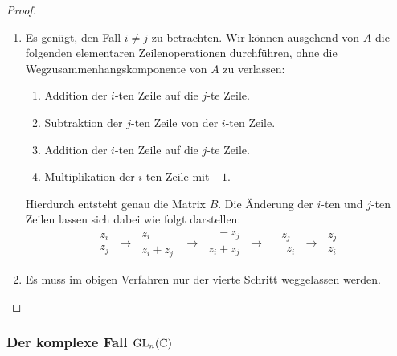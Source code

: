 \begin{proof}
\begin{enumerate}[label = \alph*)]
    \item
      Es genügt, den Fall $i \neq j$ zu betrachten.
      Wir können ausgehend von $A$ die folgenden elementaren Zeilenoperationen durchführen, ohne die Wegzusammenhangskomponente von $A$ zu verlassen:
      \begin{enumerate}[label = \arabic*.]
        \item
          Addition der $i$-ten Zeile auf die $j$-te Zeile.
        \item
          Subtraktion der $j$-ten Zeile von der $i$-ten Zeile.
        \item
          Addition der $i$-ten Zeile auf die $j$-te Zeile.
        \item
          Multiplikation der $i$-ten Zeile mit $-1$.
      \end{enumerate}
      Hierdurch entsteht genau die Matrix $B$.
      Die Änderung der $i$-ten und $j$-ten Zeilen lassen sich dabei wie folgt darstellen:
      \[
        \begin{matrix}
          z_i \\ z_j
        \end{matrix}
        \;\to\;
        \begin{matrix}
          z_i \phantom{\ + z_j} \\ z_i + z_j
        \end{matrix}
        \;\to\;
        \begin{matrix}
          \phantom{z_i} - z_j \\ z_i + z_j
        \end{matrix}
        \;\to\;
        \begin{matrix}
          -z_j \\ \phantom{-}z_i
        \end{matrix}
        \;\to\;
        \begin{matrix}
          z_j \\ z_i
        \end{matrix}
      \]
      
    \item
      Es muss im obigen Verfahren nur der vierte Schritt weggelassen werden.
    \qedhere
  \end{enumerate}
\end{proof}





\subsubsection{Der komplexe Fall \texorpdfstring{$\operatorname{GL}_{n}(\mathbb{C})$}{GLn(C)}}

